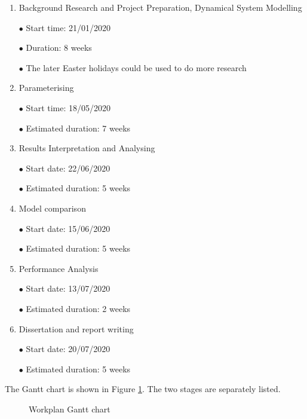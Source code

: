 \documentclass{article}
\begin{document}
\begin{enumerate}
	\item Background Research and Project Preparation, Dynamical System Modelling
	
	$\bullet$ Start time: 21/01/2020
	
	$\bullet$ Duration: 8 weeks
	
	$\bullet$ The later Easter holidays could be used to do more research

	\item Parameterising
	
	$\bullet$ Start time: 18/05/2020
	
	$\bullet$ Estimated duration: 7 weeks

	\item Results Interpretation and Analysing
	
	$\bullet$ Start date: 22/06/2020
	
	$\bullet$ Estimated duration: 5 weeks

	\item Model comparison
	
	$\bullet$ Start date: 15/06/2020
	
	$\bullet$ Estimated duration: 5 weeks

	\item Performance Analysis 
	
	$\bullet$ Start date: 13/07/2020
	
	$\bullet$ Estimated duration: 2 weeks

	\item Dissertation and report writing
	
	$\bullet$ Start date: 20/07/2020
	
	$\bullet$ Estimated duration: 5 weeks

\end{enumerate}

The Gantt chart is shown in Figure \ref{fig:3}. The two stages are separately listed.

\begin{figure}

	\begin{center}
	\end{center}
	
	\caption{Workplan Gantt chart}
	\label{fig:3}
	
	\end{figure}
\end{document}
